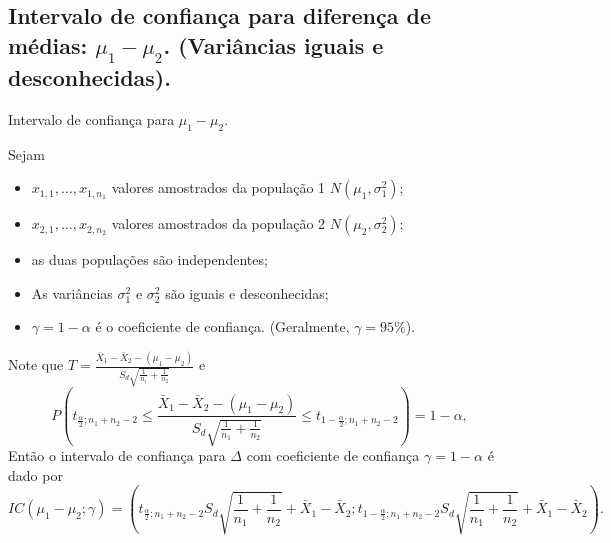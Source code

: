 \documentclass[9pt]{beamer}
\begin{document}
%
%

\subsection{Intervalo de confiança para diferença de médias: $\mu_1 - \mu_2$. (Variâncias iguais e desconhecidas).}

\begin{frame}{Intervalo de confiança para $\mu_1 - \mu_2$.}

\normalsize

Sejam
\begin{itemize}
	\item $x_{1,1}, \dots, x_{1,n_1}$ valores amostrados da população 1 $N(\mu_1, \sigma_1^2)$;
	\item $x_{2,1}, \dots, x_{2,n_2}$ valores amostrados da população 2 $N(\mu_2, \sigma_2^2)$;
	\item as duas populações são independentes;
	\item As variâncias $\sigma_1^2$ e $\sigma_2^2$ são iguais e desconhecidas; 
	\item $\gamma=1-\alpha$ é o coeficiente de confiança. (Geralmente, $\gamma=95\%$).
\end{itemize}

Note que $T = \frac{\bar{X}_1  - \bar{X}_2 -(\mu_1 - \mu_2) }{S_d\sqrt{\frac{1}{n_1} + \frac{1}{n_2}}}$ e 
$$P\left( t_{\frac{\alpha}{2}; n_1+n_2-2} \leq \frac{\bar{X}_1  - \bar{X}_2 -(\mu_1 - \mu_2) }{S_d\sqrt{\frac{1}{n_1} + \frac{1}{n_2}}} \leq t_{1-\frac{\alpha}{2}; n_1+n_2-2} \right) = 1 - \alpha,$$
Então o intervalo de confiança para $\Delta$ com coeficiente de confiança $\gamma=1-\alpha$ é dado por
{\scriptsize
	$$IC\left(\mu_1 - \mu_2; \gamma\right) = \left( t_{\frac{\alpha}{2}; n_1+n_2-2} S_d \sqrt{\frac{1}{n_1} + \frac{1}{n_2}} + \bar{X}_1 - \bar{X}_2; t_{1-\frac{\alpha}{2}; n_1+n_2-2} S_d \sqrt{\frac{1}{n_1} + \frac{1}{n_2}} + \bar{X}_1 - \bar{X}_2 \right).$$
}

\normalsize
\end{frame}
\end{document}
